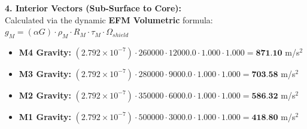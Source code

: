 \documentclass[11pt, a4paper]{article}
\begin{document}
  \vspace{0.5em}
  \noindent \textbf{4. Interior Vectors (Sub-Surface to Core):} \\[0.5em]
  \hspace*{1em} Calculated via the dynamic \textbf{EFM Volumetric} formula: $g_M = (\alpha G) \cdot \rho_{M} \cdot R_M \cdot \tau_M \cdot \Omega_{shield}$
  \begin{itemize}
    \item \textbf{M4 Gravity:} $(2.792 \times 10^{-7}) \cdot 260000 \cdot 12000.0 \cdot 1.000 \cdot 1.000 = \textbf{871.10}$ m/s$^2$
    \item \textbf{M3 Gravity:} $(2.792 \times 10^{-7}) \cdot 280000 \cdot 9000.0 \cdot 1.000 \cdot 1.000 = \textbf{703.58}$ m/s$^2$
    \item \textbf{M2 Gravity:} $(2.792 \times 10^{-7}) \cdot 350000 \cdot 6000.0 \cdot 1.000 \cdot 1.000 = \textbf{586.32}$ m/s$^2$
    \item \textbf{M1 Gravity:} $(2.792 \times 10^{-7}) \cdot 500000 \cdot 3000.0 \cdot 1.000 \cdot 1.000 = \textbf{418.80}$ m/s$^2$
  \end{itemize}
\end{document}
